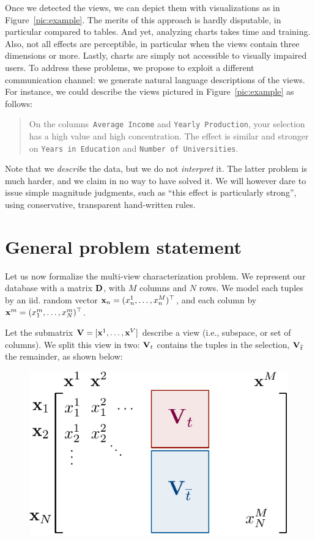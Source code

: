 Once we detected the views, we can depict them with visualizations as in
Figure~\ref{pic:example}. The merits of this approach is hardly disputable, in
particular compared to tables. And yet, analyzing charts takes time and
training. Also, not all effects are perceptible, in particular when the views
contain three dimensions or more. Lastly, charts are simply not accessible to
visually impaired users. To address these problems, we propose to exploit a
different communication channel: we generate natural language descriptions of
the views. For instance, we could describe the views pictured in
Figure~\ref{pic:example} as follows:
\begin{quotation}
    On the columns~\texttt{Average Income} and \texttt{Year\-ly Production},
    your selection has a high value and high concentration. The effect is
    similar and stronger on \texttt{Years in Education} and \texttt{Number of
    Universities}.
\end{quotation}
Note that we \emph{describe} the data, but we do not \emph{interpret} it. The
latter problem is much harder, and we claim in no way to have solved it. We
will however dare to issue simple ma\-gni\-tude judgments, such as ``this
effect is particularly strong'', using conservative, transparent hand-written
rules.


\section{General problem statement}
\label{sec:problem}
Let us now formalize the multi-view characterization problem. We represent our
database with a matrix $\mathbf{D}$, with $M$ columns and $N$ rows.  We model 
each tuples by an iid. random vector  $\mathbf{x}_n = (x^1_n, \dots, x^M_n)^\top$,
and each column by  $\mathbf{x}^{m}= (x^m_1, \dots, x^m_N)^\top$.

Let the submatrix $\mathbf{V}  = [\mathbf{x}^1, \dots, \mathbf{x}^V]$ describe a view
(i.e., subspace, or set of columns). We split this view in two:  ${\mathbf{V}}_t$
contains the tuples in the selection, ${\mathbf{V}}_{\overline{t}}$ the remainder,
as shown below:
\begin{figure}[h!]
  \centering
  \includegraphics[width=0.5\columnwidth]{Figures/Notations}
  \label{pic:notations}
\end{figure}


